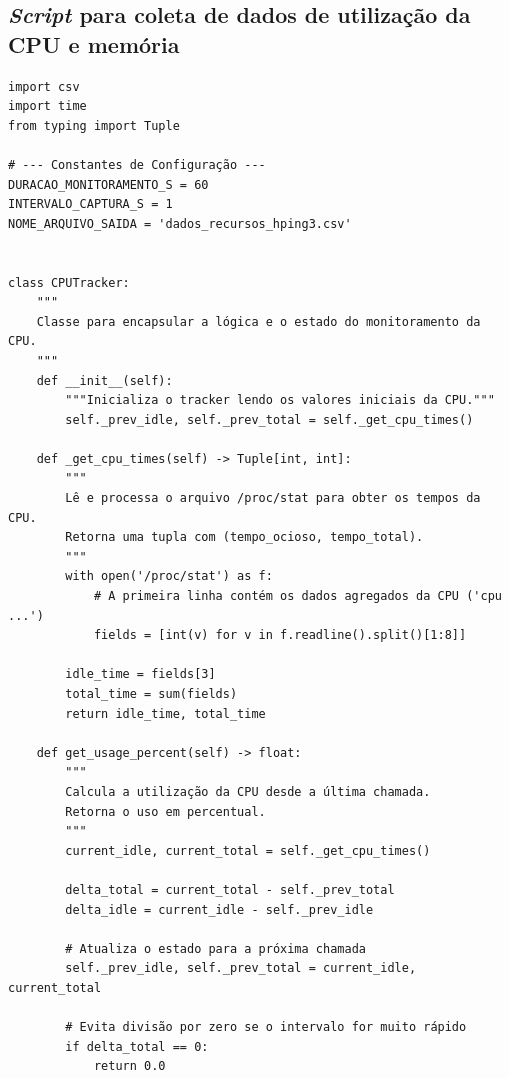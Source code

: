 \begin{anexosenv}

\partanexos

\chapter{\textit{Script} para coleta de dados de utilização da CPU e memória} \label{anexo:script}

\begin{verbatim}
import csv
import time
from typing import Tuple

# --- Constantes de Configuração ---
DURACAO_MONITORAMENTO_S = 60
INTERVALO_CAPTURA_S = 1
NOME_ARQUIVO_SAIDA = 'dados_recursos_hping3.csv'


class CPUTracker:
    """
    Classe para encapsular a lógica e o estado do monitoramento da CPU.
    """
    def __init__(self):
        """Inicializa o tracker lendo os valores iniciais da CPU."""
        self._prev_idle, self._prev_total = self._get_cpu_times()

    def _get_cpu_times(self) -> Tuple[int, int]:
        """
        Lê e processa o arquivo /proc/stat para obter os tempos da CPU.
        Retorna uma tupla com (tempo_ocioso, tempo_total).
        """
        with open('/proc/stat') as f:
            # A primeira linha contém os dados agregados da CPU ('cpu ...')
            fields = [int(v) for v in f.readline().split()[1:8]]
        
        idle_time = fields[3]
        total_time = sum(fields)
        return idle_time, total_time

    def get_usage_percent(self) -> float:
        """
        Calcula a utilização da CPU desde a última chamada.
        Retorna o uso em percentual.
        """
        current_idle, current_total = self._get_cpu_times()

        delta_total = current_total - self._prev_total
        delta_idle = current_idle - self._prev_idle

        # Atualiza o estado para a próxima chamada
        self._prev_idle, self._prev_total = current_idle, current_total
        
        # Evita divisão por zero se o intervalo for muito rápido
        if delta_total == 0:
            return 0.0


\end{verbatim}
\end{anexosenv}
